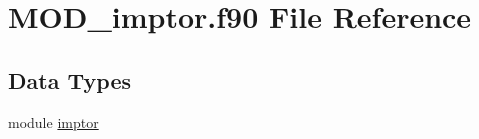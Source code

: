 \hypertarget{MOD__imptor_8f90}{\section{M\-O\-D\-\_\-imptor.\-f90 File Reference}
\label{MOD__imptor_8f90}
}
\subsection*{Data Types}
\begin{DoxyCompactItemize}
\item 
module \hyperlink{classimptor}{imptor}
\end{DoxyCompactItemize}
